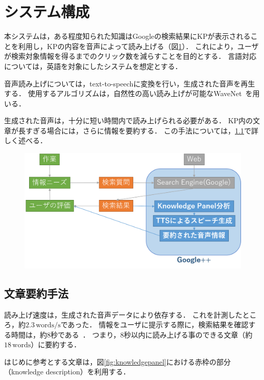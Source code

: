 \documentclass[pdflatex,ja=standard]{bxjsarticle}
\begin{document}
\section{システム構成}

本システムは，ある程度知られた知識はGoogleの検索結果にKPが表示されることを利用し，KPの内容を音声によって読み上げる（図\ref{fig:system}）．
これにより，ユーザが検索対象情報を得るまでのクリック数を減らすことを目的とする．
言語対応については，英語を対象にしたシステムを想定とする．

音声読み上げについては，text-to-speechに変換を行い，生成された音声を再生する．
使用するアルゴリズムは，自然性の高い読み上げが可能なWaveNet~\cite{Oord2016}を用いる．

生成された音声は，十分に短い時間内で読み上げられる必要がある．
KP内の文章が長すぎる場合には，さらに情報を要約する．
この手法については，\ref{sec:summarize}で詳しく述べる．

\begin{figure}[htb]
\begin{center}
    \includegraphics[width=14cm]{figs/system.png}
\end{center}
\caption{}
\label{fig:system}
\end{figure}

\subsection{文章要約手法} \label{sec:summarize}

読み上げ速度は，生成された音声データにより依存する．
これを計測したところ，約$2.3\,\mathrm{words/s}$であった．
情報をユーザに提示する際に，検索結果を確認する時間は，約8秒である~\cite{Granka2004}．
つまり，8秒以内に読み上げる事のできる文章（約$18\,\mathrm{words}$）に要約する．

はじめに参考とする文章は，図\ref{fig:knowledgepanel}における赤枠の部分（knowledge description）を利用する．
\end{document}

